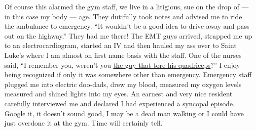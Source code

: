 Of course this alarmed the gym staff, we live in a litigious, sue on the
drop of --- in this case my body --- age. They dutifully took notes and
advised me to ride the ambulance to emergency. ``It wouldn't be a good
idea to drive away and pass out on the highway.'' They had me there! The
EMT guys arrived, strapped me up to an electrocardiogram, started an IV
and then hauled my ass over to Saint Luke's where I am almost on first
name basis with the staff. One of the nurses said, ``I remember you,
weren't you
\href{http://bakerjd99.wordpress.com/2011/02/25/a-walk-in-the-park/}{the
guy that tore his quadriceps}?'' I enjoy being recognized if only it was
somewhere other than emergency. Emergency staff plugged me into electric
doo-dads, drew my blood, measured my oxygen levels measured and shined
lights into my eyes. An earnest and very nice resident carefully
interviewed me and declared I had experienced a
\href{http://www.medicineonline.com/topics/S/2/Syncopal-Episode/Fainting.html}{syncopal
episode}. Google it, it doesn't sound good, I may be a dead man walking
or I could have just overdone it at the gym. Time will certainly tell.



%
